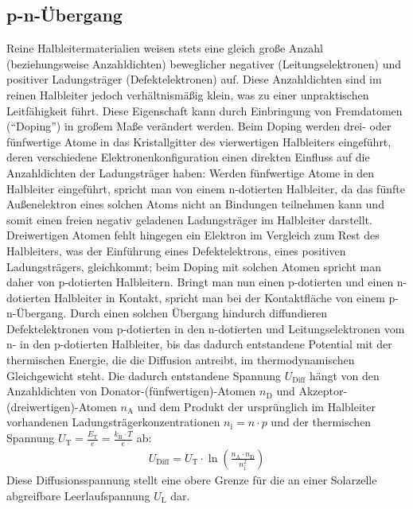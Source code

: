 \documentclass[numbers=noenddot,12pt,a4paper]{scrartcl}
\newcommand{\ix}[1]{_\text{#1}}
\begin{document}
\subsection{p-n-Übergang}
Reine Halbleitermaterialien weisen stets eine gleich große Anzahl (beziehungsweise Anzahldichten) beweglicher negativer (Leitungselektronen) und positiver Ladungsträger (Defektelektronen) auf. Diese Anzahldichten sind im reinen Halbleiter jedoch verhältnismäßig klein, was zu einer unpraktischen Leitfähigkeit führt. Diese Eigenschaft kann durch Einbringung von Fremdatomen ("`Doping"') in großem Maße verändert werden. Beim Doping werden drei- oder fünfwertige Atome in das Kristallgitter des vierwertigen Halbleiters eingeführt, deren verschiedene Elektronenkonfiguration einen direkten Einfluss auf die Anzahldichten der Ladungsträger haben: Werden fünfwertige Atome in den Halbleiter eingeführt, spricht man von einem n-dotierten Halbleiter, da das fünfte Außenelektron eines solchen Atoms nicht an Bindungen teilnehmen kann und somit einen freien negativ geladenen Ladungsträger im Halbleiter darstellt. Dreiwertigen Atomen fehlt hingegen ein Elektron im Vergleich zum Rest des Halbleiters, was der Einführung eines Defektelektrons, eines positiven Ladungsträgers, gleichkommt; beim Doping mit solchen Atomen spricht man daher von p-dotierten Halbleitern. Bringt man nun einen p-dotierten und einen n-dotierten Halbleiter in Kontakt, spricht man bei der Kontaktfläche von einem p-n-Übergang. Durch einen solchen Übergang hindurch diffundieren Defektelektronen vom p-dotierten in den n-dotierten und Leitungselektronen vom n- in den p-dotierten Halbleiter, bis das dadurch entstandene Potential mit der thermischen Energie, die die Diffusion antreibt, im thermodynamischen Gleichgewicht steht. Die dadurch entstandene Spannung $U\ix{Diff}$ hängt von den Anzahldichten von Donator-(fünfwertigen)-Atomen $n\ix{D}$ und Akzeptor-(dreiwertigen)-Atomen $n\ix{A}$ und dem Produkt der ursprünglich im Halbleiter vorhandenen Ladungsträgerkonzentrationen $n\ix{i}=n\cdot p$ und der thermischen Spannung $U\ix{T}=\frac{E\ix{T}}{e}=\frac{k\ix{B}\cdot T}{e}$ ab:
\begin{align}
U\ix{Diff}=U\ix{T}\cdot\ln\left(\frac{n\ix{A}\cdot n\ix{D}}{n\ix{i}^2} \right)
\end{align}
Diese Diffusionsspannung stellt eine obere Grenze für die an einer Solarzelle abgreifbare Leerlaufspannung $U\ix{L}$ dar.
\end{document}
